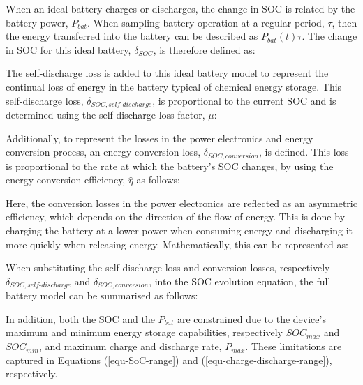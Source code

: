 


When an ideal battery charges or discharges, the change in SOC is related by the battery power, $P_{bat}$. When sampling battery operation at a regular period, $\tau$, then the energy transferred into the battery can be described as $P_{bat}(t)\tau$. The change in SOC for this ideal battery, $\delta_{SOC}$, is therefore defined as:



The self-discharge loss is added to this ideal battery model to represent the continual loss of energy in the battery typical of chemical energy storage. This self-discharge loss, $\delta_{SOC,self\text{-}discharge}$, is proportional to the current SOC and is determined using the self-discharge loss factor, $\mu$:



Additionally, to represent the losses in the power electronics and energy conversion process, an energy conversion loss, $\delta_{SOC,conversion}$, is defined. This loss is proportional to the rate at which the battery's SOC changes, by using the energy conversion efficiency, $\hat{\eta}$ as follows:



Here, the conversion losses in the power electronics are reflected as an asymmetric efficiency, which depends on the direction of the flow of energy. This is done by charging the battery at a lower power when consuming energy and discharging it more quickly when releasing energy. Mathematically, this can be represented as:



When substituting the self-discharge loss and conversion losses, respectively $\delta_{SOC,self\text{-}discharge}$ and $\delta_{SOC,conversion}$, into the SOC evolution equation, the full battery model can be summarised as follows:



In addition, both the SOC and the $P_{bat}$ are constrained due to the device's maximum and minimum energy storage capabilities, respectively $SOC_{max}$ and $SOC_{min}$, and maximum charge and discharge rate, $P_{max}$. These limitations are captured in Equations (\ref{equ-SoC-range}) and (\ref{equ-charge-discharge-range}), respectively.


